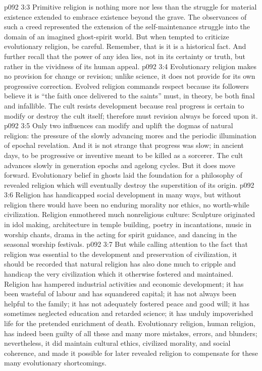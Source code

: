 \vs p092 3:3 \pc Primitive religion is nothing more nor less than the struggle for material existence extended to embrace existence beyond the grave. The observances of such a creed represented the extension of the self\hyp{}maintenance struggle into the domain of an imagined ghost\hyp{}spirit world. But when tempted to criticize evolutionary religion, be careful. Remember, that is  it is a historical fact. And further recall that the power of any idea lies, not in its certainty or truth, but rather in the vividness of its human appeal.
\vs p092 3:4 \pc Evolutionary religion makes no provision for change or revision; unlike science, it does not provide for its own progressive correction. Evolved religion commands respect because its followers believe it is  “the faith once delivered to the saints” must, in theory, be both final and infallible. The cult resists development because real progress is certain to modify or destroy the cult itself; therefore must revision always be forced upon it.
\vs p092 3:5 Only two influences can modify and uplift the dogmas of natural religion: the pressure of the slowly advancing mores and the periodic illumination of epochal revelation. And it is not strange that progress was slow; in ancient days, to be progressive or inventive meant to be killed as a sorcerer. The cult advances slowly in generation epochs and agelong cycles. But it does move forward. Evolutionary belief in ghosts laid the foundation for a philosophy of revealed religion which will eventually destroy the superstition of its origin.
\vs p092 3:6 Religion has handicapped social development in many ways, but without religion there would have been no enduring morality nor ethics, no worth\hyp{}while civilization. Religion enmothered much nonreligious culture: Sculpture originated in idol making, architecture in temple building, poetry in incantations, music in worship chants, drama in the acting for spirit guidance, and dancing in the seasonal worship festivals.
\vs p092 3:7 But while calling attention to the fact that religion was essential to the development and preservation of civilization, it should be recorded that natural religion has also done much to cripple and handicap the very civilization which it otherwise fostered and maintained. Religion has hampered industrial activities and economic development; it has been wasteful of labour and has squandered capital; it has not always been helpful to the family; it has not adequately fostered peace and good will; it has sometimes neglected education and retarded science; it has unduly impoverished life for the pretended enrichment of death. Evolutionary religion, human religion, has indeed been guilty of all these and many more mistakes, errors, and blunders; nevertheless, it did maintain cultural ethics, civilized morality, and social coherence, and made it possible for later revealed religion to compensate for these many evolutionary shortcomings.
